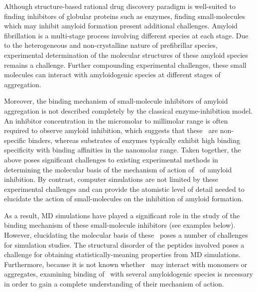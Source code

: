 
Although structure-based rational drug discovery paradigm is well-suited to finding inhibitors of globular proteins such as enzymes, finding small-molecules which may inhibit amyloid formation present additional challenges. Amyloid fibrillation is a multi-stage process involving different species at each stage.  Due to the heterogeneous and non-crystalline nature of prefibrillar species, experimental determination of the molecular structures of these amyloid species remains a challenge.  Further compounding experimental challenges, these small molecules can interact with amyloidogenic species at different stages of aggregation. 

Moreover, the binding mechanism of small-molecule inhibitors of amyloid aggregation is not described completely by the classical enzyme-inhibition model.   An inhibitor concentration in the micromolar to millimolar range is often required to observe amyloid inhibition, which suggests that these \smis\ are non-specific binders, whereas substrates of enzymes typically exhibit high binding specificity with binding affinities in the nanomolar range.  Taken together, the above poses significant challenges to existing experimental methods in determining the molecular basis of the mechanism of action of \smis\ of amyloid inhibition.  By contrast, computer simulations are not limited by these experimental challenges and can provide the atomistic level of detail needed to elucidate the action of small-molecules on the inhibition of amyloid formation.

As a result, MD simulations have played a significant role in the study of the binding mechanism of these small-molecule inhibitors (see examples below). However, elucidating the molecular basis of these \smis\ poses a number of challenges for simulation studies. The structural disorder of the peptides involved poses a challenge for obtaining statistically-meaning properties from MD simulations.  Furthermore, because it is not known whether \smis\ may interact with monomers or aggregates, examining binding of \smi\ with several amyloidogenic species is necessary in order to gain a complete understanding of their mechanism of action.

